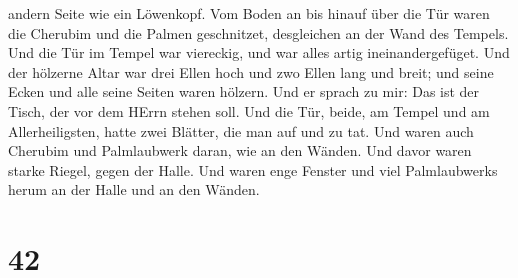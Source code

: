 andern Seite wie ein Löwenkopf.  Vom Boden an bis hinauf
über die Tür waren die Cherubim und die Palmen geschnitzet, desgleichen
an der Wand des Tempels.  Und die Tür im Tempel war
viereckig, und war alles artig ineinandergefüget.  Und der
hölzerne Altar war drei Ellen hoch und zwo Ellen lang und breit; und
seine Ecken und alle seine Seiten waren hölzern. Und er sprach zu mir:
Das ist der Tisch, der vor dem HErrn stehen soll.  Und die
Tür, beide, am Tempel und am Allerheiligsten,  hatte zwei
Blätter, die man auf und zu tat.  Und waren auch Cherubim
und Palmlaubwerk daran, wie an den Wänden. Und davor waren starke
Riegel, gegen der Halle.  Und waren enge Fenster und viel
Palmlaubwerks herum an der Halle und an den Wänden.

\hypertarget{section-41}{%
\section{42}\label{section-41}}

